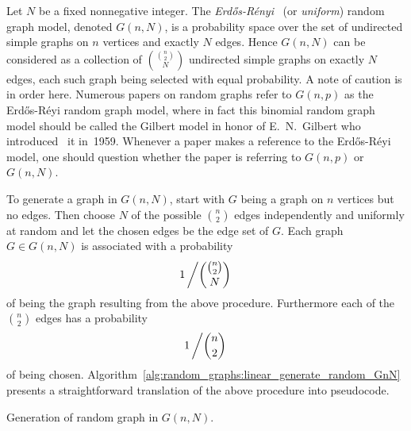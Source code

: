 Let $N$ be a fixed nonnegative integer. The
\emph{Erd\H{o}s-R\'enyi}~\cite{ErdosRenyi1959,ErdosRenyi1960}
(or
\emph{uniform}) random graph model,
denoted $G(n,N)$, is a probability space over the set of undirected
simple graphs on $n$ vertices and exactly $N$ edges. Hence $G(n,N)$
can be considered as a collection of $\binom{\binom{n}{2}} {N}$
undirected simple graphs on exactly $N$ edges, each such graph being
selected with equal probability. A note of caution is in order
here. Numerous papers on random graphs refer to $G(n,p)$ as the
Erd\H{o}s-R\'eyi random graph model, where in fact this binomial random
graph model should be called the Gilbert model in honor of
E.~N.~Gilbert who introduced~\cite{Gilbert1959} it in~1959. Whenever
a paper makes a reference to the Erd\H{o}s-R\'eyi model, one should
question whether the paper is referring to $G(n,p)$ or $G(n,N)$.

To generate a graph in $G(n,N)$, start with $G$ being a graph on $n$
vertices but no edges. Then choose $N$ of the possible $\binom{n}{2}$
edges independently and uniformly at random and let the chosen edges
be the edge set of $G$. Each graph $G \in G(n,N)$ is associated with a
probability
\[
1 \left/ \binom{\binom{n}{2}} {N} \right.
\]
of being the graph resulting from the above procedure. Furthermore
each of the $\binom{n}{2}$ edges has a probability
\[
1 \left/ \binom{n}{2} \right.
\]
of being chosen.
Algorithm~\ref{alg:random_graphs:linear_generate_random_GnN} presents
a straightforward translation of the above procedure into pseudocode.

\begin{algorithm}[!htbp]

\caption{Generation of random graph in $G(n,N)$.}
\label{alg:random_graphs:linear_generate_random_GnN}
\end{algorithm}

